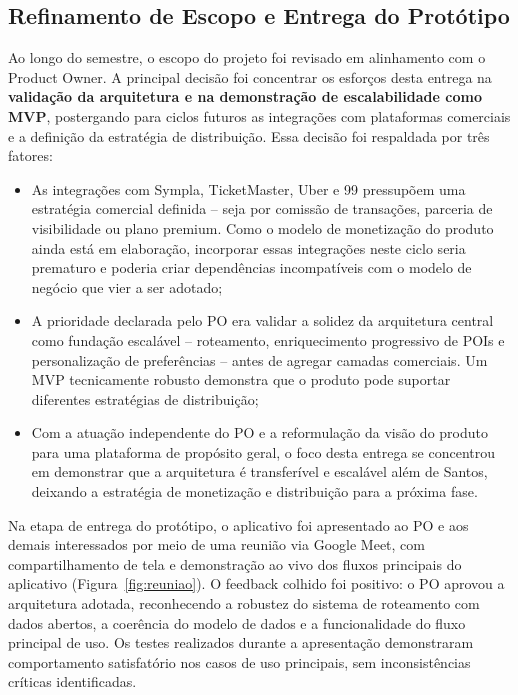 \documentclass[12pt, a4paper]{article}
\begin{document}
\subsection{Refinamento de Escopo e Entrega do Prot\'otipo}

Ao longo do semestre, o escopo do projeto foi revisado em alinhamento com o Product Owner. A principal decis\~ao foi concentrar os esfor\c{c}os desta entrega na \textbf{valida\c{c}\~ao da arquitetura e na demonstra\c{c}\~ao de escalabilidade como MVP}, postergando para ciclos futuros as integrações com plataformas comerciais e a defini\c{c}\~ao da estrat\'egia de distribui\c{c}\~ao. Essa decis\~ao foi respaldada por tr\^es fatores:

\begin{itemize}
  \item As integrações com Sympla, TicketMaster, Uber e 99 pressup\~oem uma estrat\'egia comercial definida -- seja por comiss\~ao de transa\c{c}\~oes, parceria de visibilidade ou plano premium. Como o modelo de monetiza\c{c}\~ao do produto ainda est\'a em elabora\c{c}\~ao, incorporar essas integrações neste ciclo seria prematuro e poderia criar depend\^encias incompat\'iveis com o modelo de neg\'ocio que vier a ser adotado;
  \item A prioridade declarada pelo PO era validar a solidez da arquitetura central como funda\c{c}\~ao escal\'avel -- roteamento, enriquecimento progressivo de POIs e personaliza\c{c}\~ao de prefer\^encias -- antes de agregar camadas comerciais. Um MVP tecnicamente robusto demonstra que o produto pode suportar diferentes estrat\'egias de distribui\c{c}\~ao;
  \item Com a atua\c{c}\~ao independente do PO e a reformula\c{c}\~ao da vis\~ao do produto para uma plataforma de prop\'osito geral, o foco desta entrega se concentrou em demonstrar que a arquitetura \'e transfer\'ivel e escal\'avel al\'em de Santos, deixando a estrat\'egia de monetiza\c{c}\~ao e distribui\c{c}\~ao para a pr\'oxima fase.
\end{itemize}

Na etapa de entrega do prot\'otipo, o aplicativo foi apresentado ao PO e aos demais interessados por meio de uma reuni\~ao via Google Meet, com compartilhamento de tela e demonstra\c{c}\~ao ao vivo dos fluxos principais do aplicativo (Figura~\ref{fig:reuniao}). O feedback colhido foi positivo: o PO aprovou a arquitetura adotada, reconhecendo a robustez do sistema de roteamento com dados abertos, a coer\^encia do modelo de dados e a funcionalidade do fluxo principal de uso. Os testes realizados durante a apresenta\c{c}\~ao demonstraram comportamento satisfat\'orio nos casos de uso principais, sem inconsist\^encias cr\'iticas identificadas.
\end{document}
